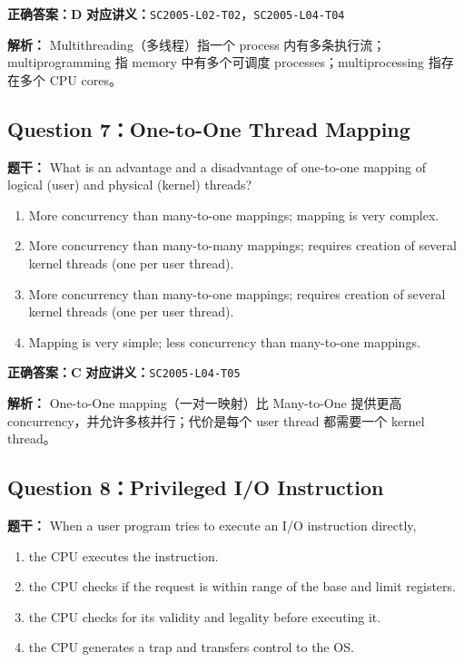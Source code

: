 \documentclass[11pt,a4paper,fontset=fandol]{ctexart}
\renewcommand{\exercisequestion}[2]{%
  \Needspace{5\baselineskip}%
  \subsection{#2}\label{exercise:#1}%
}
\renewenvironment{checkedsolution}
  {\par\nopagebreak[4]\textbf{解析：}\ignorespaces}
  {\par}
\begin{document}
\textbf{正确答案：D}\qquad
\textbf{对应讲义：}\texttt{SC2005-L02-T02}，\texttt{SC2005-L04-T04}

\begin{checkedsolution}
Multithreading（多线程）指一个 process 内有多条执行流；multiprogramming 指 memory 中有多个可调度 processes；multiprocessing 指存在多个 CPU cores。
\end{checkedsolution}

\exercisequestion{SC2005-HW01-Q07}{Question 7：One-to-One Thread Mapping}

\textbf{题干：} What is an advantage and a disadvantage of one-to-one mapping of logical (user) and physical (kernel) threads?

\begin{enumerate}[label=\Alph*.,leftmargin=2.4em]
  \item More concurrency than many-to-one mappings; mapping is very complex.
  \item More concurrency than many-to-many mappings; requires creation of several kernel threads (one per user thread).
  \item More concurrency than many-to-one mappings; requires creation of several kernel threads (one per user thread).
  \item Mapping is very simple; less concurrency than many-to-one mappings.
\end{enumerate}

\textbf{正确答案：C}\qquad
\textbf{对应讲义：}\texttt{SC2005-L04-T05}

\begin{checkedsolution}
One-to-One mapping（一对一映射）比 Many-to-One 提供更高 concurrency，并允许多核并行；代价是每个 user thread 都需要一个 kernel thread。
\end{checkedsolution}

\exercisequestion{SC2005-HW01-Q08}{Question 8：Privileged I/O Instruction}

\textbf{题干：} When a user program tries to execute an I/O instruction directly,

\begin{enumerate}[label=\Alph*.,leftmargin=2.4em]
  \item the CPU executes the instruction.
  \item the CPU checks if the request is within range of the base and limit registers.
  \item the CPU checks for its validity and legality before executing it.
  \item the CPU generates a trap and transfers control to the OS.
\end{enumerate}
\end{document}
